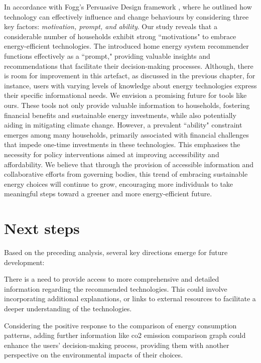 In accordance with Fogg's Persuasive Design framework \cite{Fogg2009}, 
where he outlined how technology can effectively influence and change behaviours by considering three key factors: 
\emph{motivation, prompt, and ability}. 
Our study reveals that a considerable number of households exhibit strong ``motivations" to embrace energy-efficient technologies. 
The introduced home energy system recommender functions effectively as a ``prompt," providing valuable insights and recommendations that facilitate their decision-making processes. 
Although, there is room for improvement in this artefact, as discussed in the previous chapter,
for instance, users with varying levels of knowledge about energy technologies express their specific informational needs.
We envision a promising future for tools like ours.
These tools not only provide valuable information to households, fostering financial benefits and sustainable energy investments, while also potentially aiding in mitigating climate change. 
However, a prevalent ``ability" constraint emerges among many households,
primarily associated with financial challenges that impede one-time investments in these technologies. 
This emphasises the necessity for policy interventions aimed at improving accessibility and affordability. 
We believe that through the provision of accessible information and collaborative efforts from governing bodies, this trend of embracing sustainable energy choices will continue to grow, encouraging more individuals to take meaningful steps toward a greener and more energy-efficient future.  


\section{Next steps}

Based on the preceding analysis, several key directions emerge for future development:

There is a need to provide access to more comprehensive and detailed information regarding the recommended technologies. 
This could involve incorporating additional explanations, or links to external resources to facilitate a deeper understanding of the technologies.

Considering the positive response to the comparison of energy consumption patterns, adding further information like \gls{co2} emission comparison graph could enhance the users' decision-making process, providing them with another perspective on the environmental impacts of their choices.

